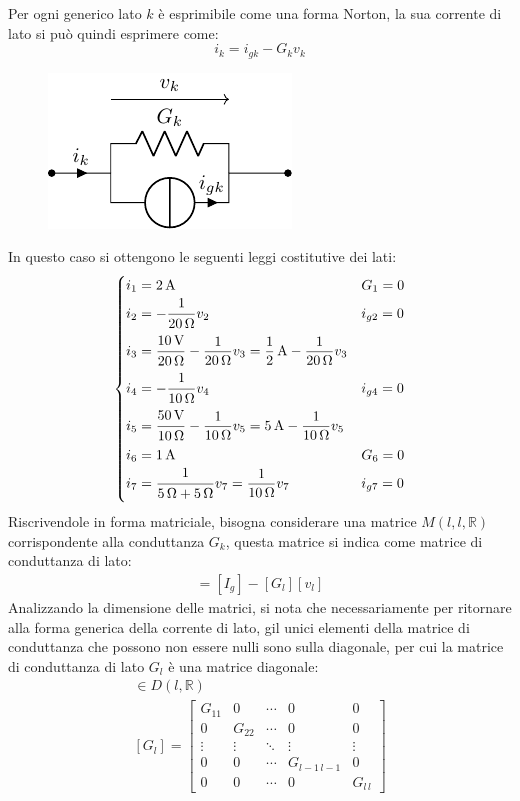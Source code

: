 \documentclass{article}
\newcommand{\SI}[1]{\mathrm{#1}}
\numberwithin{equation}{subsection}
\begin{document}
Per ogni generico lato $k$ è esprimibile come una forma Norton, la sua corrente di lato si può quindi esprimere come:
\begin{equation*}
    i_k=i_{gk}-G_kv_k
\end{equation*}
\begin{figure}[H]%
    \centering
    \includegraphics{lato-norton-generico.pdf}%
    \label{fig:lato-norton-generico}
\end{figure}
In questo caso si ottengono le seguenti leggi costitutive dei lati:
\begin{equation*}
    \begin{cases}
        i_1=2\,\SI{A}&G_1=0\\
        i_2=\displaystyle-\frac{\strut 1}{\strut 20\,\Omega}v_2&i_{g2}=0\\
        i_3=\displaystyle\frac{\strut 10\,\SI{V}}{\strut 20\,\Omega}-\frac{1}{20\,\Omega}v_3=\frac{1}{2}\,\SI{A}-\frac{1}{20\,\Omega}v_3\\
        i_4=\displaystyle-\frac{\strut 1}{\strut 10\,\Omega}v_4 &i_{g4}=0\\
        i_5=\displaystyle\frac{\strut 50\,\SI{V}}{\strut 10\,\Omega}-\frac{1}{10\,\Omega}v_5=5\,\SI{A}-\displaystyle\frac{1}{10\,\Omega}v_5\\
        i_6=1\,\SI{A} &G_6=0\\
        i_7=\displaystyle\frac{\strut 1}{\strut 5\,\Omega+5\,\Omega}v_7=\frac{1}{10\,\Omega}v_7
        &i_{g7}=0
    \end{cases}
\end{equation*}
Riscrivendole in forma matriciale, bisogna considerare una matrice $M(l,l,\mathbb{R})$ corrispondente alla conduttanza $G_k$, questa matrice si indica come matrice di 
conduttanza di lato: 
\begin{gather*}
    [i_l]=[I_g]-[G_l][v_l]
\end{gather*}
Analizzando la dimensione delle matrici, si nota che necessariamente per ritornare alla forma generica della corrente di lato, gil unici elementi della matrice di 
conduttanza che possono non essere nulli sono sulla diagonale, per cui la matrice di conduttanza di lato $G_l$ è una matrice diagonale:
\begin{gather*}
    [G_l]\in D(l,\mathbb{R})\\
    [G_l]=\begin{bmatrix}
        G_{11}&0&\cdots&0&0\\
        0&G_{22}&\cdots&0&0\\
        \vdots&\vdots&\ddots&\vdots&\vdots\\
        0&0&\cdots&G_{l-1\,l-1}&0\\
        0&0&\cdots&0&G_{l\,l}
    \end{bmatrix}
\end{gather*}
\end{document}
